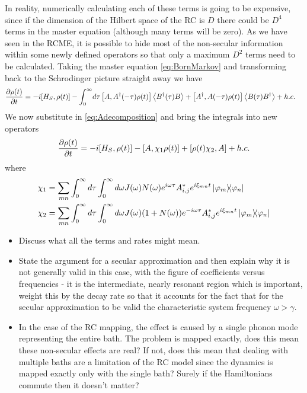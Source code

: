 \documentclass[]{article}
\begin{document}
In reality, numerically calculating each of these terms is going to be expensive, since if the dimension of the Hilbert space of the RC is $D$ there could be $D^4$ terms in the master equation (although many terms will be zero). As we have seen in the RCME, it is possible to hide most of the non-secular information within some newly defined operators so that only a maximum $D^2$ terms need to be calculated. Taking the master equation \ref{eq:BornMarkov} and transforming back to the Schrodinger picture straight away we have
\begin{align}
	\begin{split}
		\label{eq:BornMarkovSchrod}
		\pdv{\rho(t)}{t} = -i[H_S, \rho(t)] - \int_{0}^{\infty}& d\tau  \left[A, A^{\dagger}(-\tau)\rho(t)\right] \expval{B^{\dagger}(\tau)B} + \left[A^{\dagger},A(-\tau)\rho(t)\right] \expval{B(\tau)B^{\dagger}} + h.c.
	\end{split}
\end{align}
We now substitute in \ref{eq:Adecomposition} and bring the integrals into new operators
\begin{align}
	\begin{split}
		\pdv{\rho(t)}{t} = -i[H_S, \rho(t)] - \left[A, \chi_1\rho(t)\right]  + \left[\rho(t)\chi_2,A\right] + h.c.
	\end{split}
\end{align}
where 
\begin{align}
	\begin{split}
\chi_1 &= \sum_{m n}\int_{0}^{\infty}d\tau\int_{0}^{\infty}d\omega J(\omega)N(\omega)e^{i\omega\tau}A_{i,j}^* e^{i\xi_{mn}t}\dyad{\varphi_m}{\varphi_n} \\
\chi_2 &= \sum_{m n}\int_{0}^{\infty}d\tau\int_{0}^{\infty}d\omega J(\omega)(1+N(\omega))e^{-i\omega\tau}A_{i,j}^* e^{i\xi_{mn}t}\dyad{\varphi_m}{\varphi_n} 
	\end{split}
\end{align}

\begin{itemize}
	\item Discuss what all the terms and rates might mean.
	\item State the argument for a secular approximation and then explain why it is not generally valid in this case, with the figure of coefficients versus frequencies - it is the intermediate, nearly resonant region which is important, weight this by the decay rate so that it accounts for the fact that for the secular approximation to be valid the characteristic system frequency $\omega>\gamma$.
	\item In the case of the RC mapping, the effect is caused by a single phonon mode representing the entire bath. The problem is mapped exactly, does this mean these non-secular effects are real? If not, does this mean that dealing with multiple baths are a limitation of the RC model since the dynamics is mapped exactly only with the single bath? Surely if the Hamiltonians commute then it doesn't matter?
\end{itemize}
\end{document}
